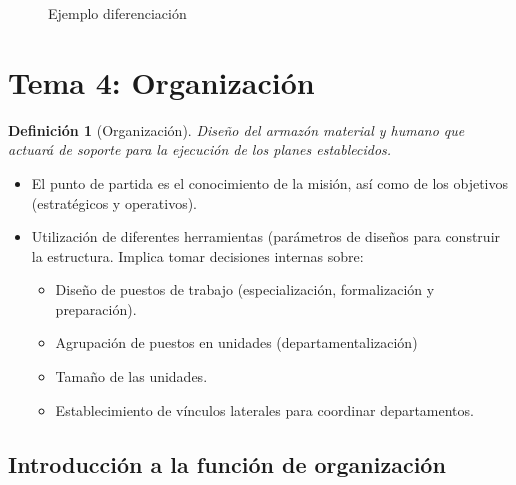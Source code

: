 \documentclass[12pt]{article}
\theoremstyle{definition_wo_parentheses}
\newtheorem{definicion}{Definición}[section]
\begin{document}
\begin{figure}[H]
 \centering
 \caption{Ejemplo diferenciación}
 \label{f:dif}
\end{figure}


\section{Tema 4: Organización}

\begin{definicion}[Organización] 
	Diseño del armazón material y humano que actuará de soporte para la ejecución de los planes establecidos.
\end{definicion}

\begin{itemize}
\item El punto de partida es el conocimiento de la misión, así como de los objetivos (estratégicos y operativos).

\item Utilización de diferentes herramientas (parámetros de diseños para construir la estructura. Implica tomar decisiones internas sobre: 

	\begin{itemize}
		\item Diseño de puestos de trabajo (especialización, formalización y preparación).
		\item Agrupación de puestos en unidades (departamentalización)
		\item Tamaño de las unidades.
		\item Establecimiento de vínculos laterales para coordinar departamentos.
	\end{itemize}

\end{itemize}


\subsection{Introducción a la función de organización}
\end{document}
